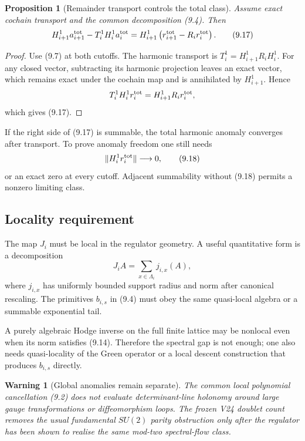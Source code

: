 \documentclass[11pt]{article}
\newtheorem{proposition}[theorem]{Proposition}
\newtheorem{warning}[theorem]{Warning}
\theoremstyle{remark}
\begin{document}
\begin{proposition}[Remainder transport controls the total class]
\label{prop:v12v9-refine}
Assume exact cochain transport and the common decomposition (9.4).
Then
\[
 \begin{split}
 H_{i+1}^1a_{i+1}^{\rm tot}
 -T_i^1H_i^1a_i^{\rm tot}
 =H_{i+1}^1
   \left(r_{i+1}^{\rm tot}-R_ir_i^{\rm tot}\right).          \tag{9.17}
 \end{split}
\]
\end{proposition}

\begin{proof}
Use (9.7) at both cutoffs.  The harmonic transport is
\(T_i^1=H_{i+1}^1R_iH_i^1\).  For any closed vector, subtracting its
harmonic projection leaves an exact vector, which remains exact under
the cochain map and is annihilated by \(H_{i+1}^1\).  Hence
\[
 T_i^1H_i^1r_i^{\rm tot}=H_{i+1}^1R_ir_i^{\rm tot},
\]
which gives (9.17).
\end{proof}

If the right side of (9.17) is summable, the total harmonic anomaly
converges after transport.  To prove anomaly freedom one still needs
\[
                              \|H_i^1r_i^{\rm tot}\|
                              \longrightarrow0,              \tag{9.18}
\]
or an exact zero at every cutoff.  Adjacent summability without
(9.18) permits a nonzero limiting class.

\subsection{Locality requirement}

The map \(J_i\) must be local in the regulator geometry.  A useful
quantitative form is a decomposition
\[
                              J_iA=\sum_{x\in\Lambda_i}
                                      j_{i,x}(A),            \tag{9.19}
\]
where \(j_{i,x}\) has uniformly bounded support radius and norm after
canonical rescaling.  The primitives \(b_{i,s}\) in (9.4) must obey
the same quasi-local algebra or a summable exponential tail.

A purely algebraic Hodge inverse on the full finite lattice may be
nonlocal even when its norm satisfies (9.14).  Therefore the spectral
gap is not enough; one also needs quasi-locality of the Green operator
or a local descent construction that produces \(b_{i,s}\) directly.

\begin{warning}[Global anomalies remain separate]
\label{warn:v12v9-global}
The common local polynomial cancellation (9.2) does not evaluate
determinant-line holonomy around large gauge transformations or
diffeomorphism loops.  The frozen V24 doublet count removes the usual
fundamental \(SU(2)\) parity obstruction only after the regulator has
been shown to realise the same mod-two spectral-flow class.
\end{warning}
\end{document}
